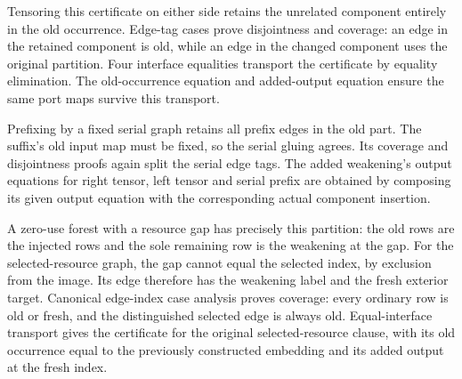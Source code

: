 
Tensoring this certificate on either side retains the unrelated component
entirely in the old occurrence. Edge-tag cases prove disjointness and coverage:
an edge in the retained component is old, while an edge in the changed
component uses the original partition. Four interface equalities transport
the certificate by equality elimination. The old-occurrence equation and
added-output equation ensure the same port maps survive this transport.






Prefixing by a fixed serial graph retains all prefix edges in the old part.
The suffix's old input map must be fixed, so the serial gluing agrees. Its
coverage and disjointness proofs again split the serial edge tags. The added
weakening's output equations for right tensor, left tensor and serial prefix
are obtained by composing its given output equation with the corresponding
actual component insertion.





A zero-use forest with a resource gap has precisely this partition: the
old rows are the injected rows and the sole remaining row is the weakening
at the gap. For the selected-resource graph, the gap cannot equal the selected
index, by exclusion from the image. Its edge therefore has the weakening
label and the fresh exterior target. Canonical edge-index case analysis proves
coverage: every ordinary row is old or fresh, and the distinguished selected
edge is always old. Equal-interface transport gives the certificate for the
original selected-resource clause, with its old occurrence equal to the
previously constructed embedding and its added output at the fresh index.

